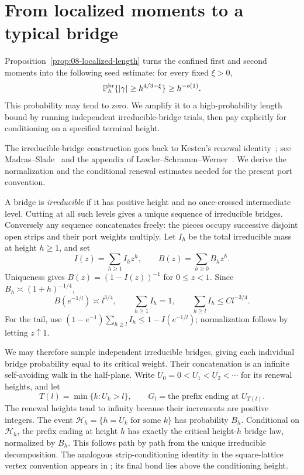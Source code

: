 \section{From localized moments to a typical bridge}\label{sec:renewal}

Proposition~\ref{prop:08-localized-length} turns the confined first and
second moments into the following seed estimate: for every fixed
\(\xi>0\),
\[
 \mathbb P_h^{\rm br}\{|\gamma|\ge h^{4/3-\xi}\}\ge h^{-o(1)}.
\]
This probability may tend to zero. We amplify it to a high-probability
length bound by running independent irreducible-bridge trials, then
pay explicitly for conditioning on a specified terminal height.

The irreducible-bridge construction goes back to Kesten's renewal
identity~\cite{Kesten1963}; see Madras--Slade~\cite{MadrasSlade1993}
and the appendix of Lawler--Schramm--Werner~\cite{LSW2004}.
We derive the normalization and the conditional renewal estimates
needed for the present port convention.

A bridge is \emph{irreducible} if it has positive height and no
once-crossed intermediate level. Cutting at all such levels gives a unique
sequence of irreducible bridges. Conversely any sequence concatenates
freely: the pieces occupy successive disjoint open strips and their port
weights multiply. Let \(I_h\) be the total irreducible mass at height
\(h\ge1\), and set
\[
 I(z)=\sum_{h\ge1}I_hz^h,\qquad B(z)=\sum_{h\ge0}B_hz^h.
\]
Uniqueness gives \(B(z)=(1-I(z))^{-1}\) for \(0\le z<1\).
Since \(B_h\asymp(1+h)^{-1/4}\),
\[
 B(e^{-1/l})\asymp l^{3/4},\qquad
 \sum_{h\ge1}I_h=1,\qquad \sum_{h\ge l}I_h\le Cl^{-3/4}.
\]
For the tail, use
\((1-e^{-1})\sum_{h\ge l}I_h\le1-I(e^{-1/l})\); normalization follows
by letting \(z\uparrow1\).

We may therefore sample independent irreducible bridges, giving each
individual bridge probability equal to its critical weight. Their
concatenation is an infinite self-avoiding walk in the half-plane. Write
\(U_0=0<U_1<U_2<\cdots\) for its renewal heights, and let
\[
 T(l)=\min\{k:U_k>l\},\qquad G_l=\text{the prefix ending at }U_{T(l)}.
\]
The renewal heights tend to infinity because their increments are positive
integers. The event \(\mathcal H_h=\{h=U_k\text{ for some }k\}\) has probability
\(B_h\). Conditional on \(\mathcal H_h\), the prefix ending at height \(h\)
has exactly the critical height-\(h\) bridge law, normalized by \(B_h\).
This follows path by path from the unique irreducible decomposition.
The analogous strip-conditioning identity in the square-lattice vertex
convention appears in \cite[Proposition 2.10]{DyhrEtAl2011}; its final
bond lies above the conditioning height.

